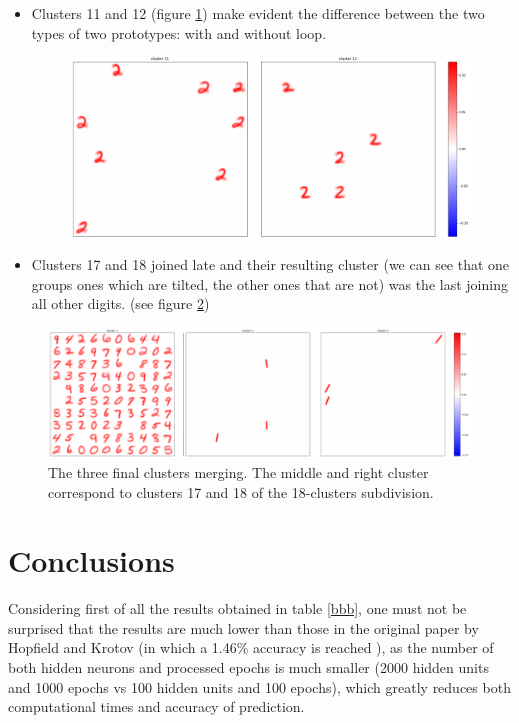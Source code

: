 \documentclass[a4paper]{report}
\begin{document}
\begin{itemize}
    \item Clusters 11 and 12 (figure \ref{1112}) make evident the difference between the two types of two prototypes: with and without loop.

\begin{figure} [H]
    \centering
    \includegraphics [width=\textwidth ] {c/h/11.png}
    \caption{}
    \label{1112}
\end{figure}

    \item Clusters 17 and 18 joined late and their resulting cluster (we can see that one groups ones which are tilted, the other ones that are not) was the last joining all other digits. (see figure \ref{final})
\end{itemize}

\begin{figure} [H]
    \centering
    \includegraphics  [width=\textwidth]  {c/h/final1.png}
    \caption{The three final clusters merging. The middle and right cluster correspond to clusters 17 and 18 of the 18-clusters subdivision.}
    \label{final}
\end{figure}

\chapter{Conclusions}

Considering first of all the results obtained in table \ref{bbb}, one must not be surprised that the results are much lower than those in the original paper by Hopfield and Krotov (in which a 1.46\% accuracy is reached ), as the number of both hidden neurons and processed epochs is much smaller (2000 hidden units and 1000 epochs vs 100 hidden units and 100 epochs), which greatly reduces both computational times and accuracy of prediction. 
\end{document}
